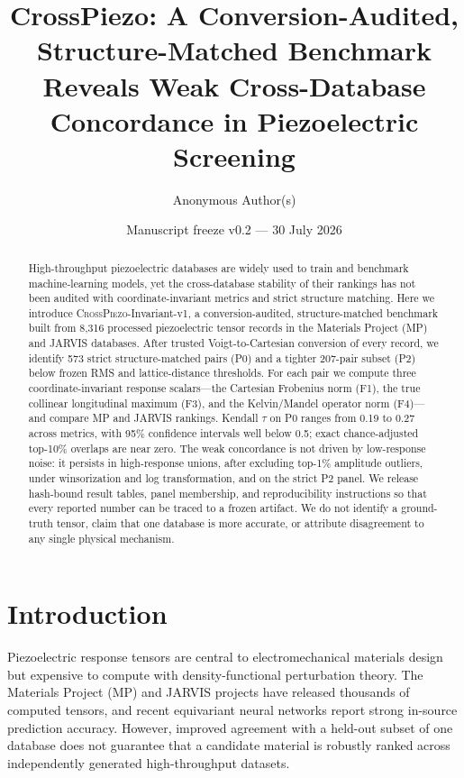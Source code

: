 \documentclass[11pt]{article}
\title{\textbf{CrossPiezo: A Conversion-Audited, Structure-Matched Benchmark Reveals Weak Cross-Database Concordance in Piezoelectric Screening}}
\author[1]{Anonymous Author(s)}
\affil[1]{Anonymous Institution}
\date{Manuscript freeze v0.2 --- 30 July 2026}
\begin{document}
\maketitle

\begin{abstract}
High-throughput piezoelectric databases are widely used to train and benchmark machine-learning models, yet the cross-database stability of their rankings has not been audited with coordinate-invariant metrics and strict structure matching. Here we introduce \textsc{CrossPiezo}-Invariant-v1, a conversion-audited, structure-matched benchmark built from 8,316 processed piezoelectric tensor records in the Materials Project (MP) and JARVIS databases. After trusted Voigt-to-Cartesian conversion of every record, we identify 573 strict structure-matched pairs (P0) and a tighter 207-pair subset (P2) below frozen RMS and lattice-distance thresholds. For each pair we compute three coordinate-invariant response scalars---the Cartesian Frobenius norm (F1), the true collinear longitudinal maximum (F3), and the Kelvin/Mandel operator norm (F4)---and compare MP and JARVIS rankings. Kendall $\tau$ on P0 ranges from 0.19 to 0.27 across metrics, with 95\% confidence intervals well below 0.5; exact chance-adjusted top-10\% overlaps are near zero. The weak concordance is not driven by low-response noise: it persists in high-response unions, after excluding top-1\% amplitude outliers, under winsorization and log transformation, and on the strict P2 panel. We release hash-bound result tables, panel membership, and reproducibility instructions so that every reported number can be traced to a frozen artifact. We do not identify a ground-truth tensor, claim that one database is more accurate, or attribute disagreement to any single physical mechanism.
\end{abstract}

\section{Introduction}

Piezoelectric response tensors are central to electromechanical materials design but expensive to compute with density-functional perturbation theory. The Materials Project (MP) and JARVIS projects have released thousands of computed tensors\cite{dejong2015,choudhary2020}, and recent equivariant neural networks report strong in-source prediction accuracy\cite{yan2024,dong2025}. However, improved agreement with a held-out subset of one database does not guarantee that a candidate material is robustly ranked across independently generated high-throughput datasets\cite{hegde2023}.
\end{document}
